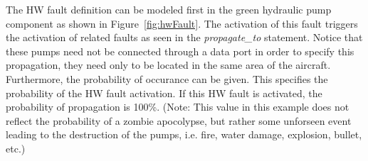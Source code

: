 The HW fault definition can be modeled first in the green hydraulic pump component as shown in Figure~\ref{fig:hwFault}. The activation of this fault triggers the activation of related faults as seen in the \textit{propagate\_to} statement. Notice that these pumps need not be connected through a data port in order to specify this propagation, they need only to be located in the same area of the aircraft. Furthermore, the probability of occurance can be given. This specifies the probability of the HW fault activation. If this HW fault is activated, the probability of propagation is 100\%. (Note: This value in this example does not reflect the probability of a zombie apocolypse, but rather some unforseen event leading to the destruction of the pumps, i.e. fire, water damage, explosion, bullet, etc.)  

















